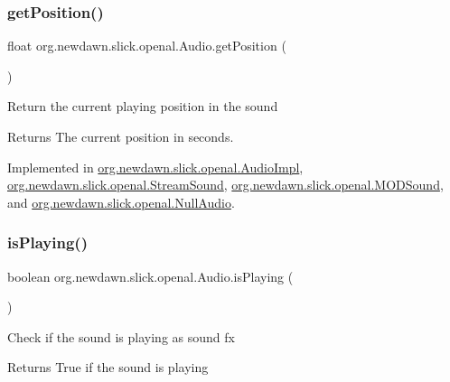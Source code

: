 \subsubsection{\texorpdfstring{get\+Position()}{getPosition()}}
{\footnotesize\ttfamily float org.\+newdawn.\+slick.\+openal.\+Audio.\+get\+Position (\begin{DoxyParamCaption}{ }\end{DoxyParamCaption})}

Return the current playing position in the sound

\begin{DoxyReturn}{Returns}
The current position in seconds. 
\end{DoxyReturn}


Implemented in \mbox{\hyperlink{classorg_1_1newdawn_1_1slick_1_1openal_1_1_audio_impl_a71aa3ed24fc3e7e4e8603b89250b35bd}{org.\+newdawn.\+slick.\+openal.\+Audio\+Impl}}, \mbox{\hyperlink{classorg_1_1newdawn_1_1slick_1_1openal_1_1_stream_sound_a80df2cee9e1a68cd0c0bdb2f9140ffe6}{org.\+newdawn.\+slick.\+openal.\+Stream\+Sound}}, \mbox{\hyperlink{classorg_1_1newdawn_1_1slick_1_1openal_1_1_m_o_d_sound_ad3ac36d37787ee920277826347875e4a}{org.\+newdawn.\+slick.\+openal.\+M\+O\+D\+Sound}}, and \mbox{\hyperlink{classorg_1_1newdawn_1_1slick_1_1openal_1_1_null_audio_a66050286dce4cedbeed88489d6bd5d5f}{org.\+newdawn.\+slick.\+openal.\+Null\+Audio}}.

\mbox{\label{interfaceorg_1_1newdawn_1_1slick_1_1openal_1_1_audio_a842b49128a58be8c4473cbcc8ee4ad9e}} 
\subsubsection{\texorpdfstring{is\+Playing()}{isPlaying()}}
{\footnotesize\ttfamily boolean org.\+newdawn.\+slick.\+openal.\+Audio.\+is\+Playing (\begin{DoxyParamCaption}{ }\end{DoxyParamCaption})}

Check if the sound is playing as sound fx

\begin{DoxyReturn}{Returns}
True if the sound is playing 
\end{DoxyReturn}


